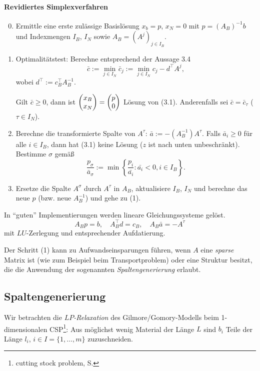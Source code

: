 \paragraph{Revidiertes Simplexverfahren}
\begin{enumerate}[(1)]
  \setcounter{enumi}{-1}
\item Ermittle eine erste zulässige Basislösung $x_b = p$, $x_N = 0$ mit $p =
  (A_B)^{-1} b$ und Indexmengen $I_B$, $I_N$ sowie $A_B = (A^j)_{j \in I_B}$.
\item Optimalitätstest: Berechne entsprechend der Aussage 3.4
  \[ \bar{c} := \min_{j \in I_N} \bar{c}_j := \min_{j \in I_N} c_j - d^\top A^j, \]
  wobei $d^\top := c_B^\top A_B^{-1}$.

  Gilt $\bar{c} \ge 0$, dann ist $\begin{pmatrix}x_B \\ x_N\end{pmatrix} = \begin{pmatrix}p \\ 0\end{pmatrix}$ Lösung von
  (3.1). Anderenfalls sei $\bar{c} = \bar{c}_\tau$ ($\tau \in I_N$).
\item Berechne die transformierte Spalte von $A^\tau$: $\bar{a} := -(A_B^{-1})
  A^\tau$. Falls  $\bar{a}_i \ge 0$ für alle $i \in I_B$, dann hat (3.1) keine
  Lösung ($z$ ist nach unten unbeschränkt). Bestimme $\sigma$ gemäß
  \[ \frac{ p_\sigma }{ \bar{a}_\sigma } := \min \left\{ \frac{p_i}{\bar{a_i}} :
      \bar{a_i} < 0, i \in I_B \right\}. \]
\item Ersetze die Spalte $A^\sigma$ durch $A^\tau$ in $A_B$, aktualisiere $I_B$,
  $I_N$ und berechne das neue $p$ (bzw. neue $A_B^{-1}$) und gehe zu (1).
\end{enumerate}

\begin{rmrk}
  In ``guten'' Implementierungen werden lineare Gleichungssysteme gelöst.
  \[ A_B p = b, \quad A_B^\top d = c_B, \quad A_B  \bar{a} = -A^\tau \]
  mit $LU$-Zerlegung und entsprechender Aufdatierung.
\end{rmrk}

\begin{rmrk}
  Der Schritt (1) kann zu Aufwandseinsparungen führen, wenn $A$ eine
  \emph{sparse} Matrix ist (wie zum Beispiel beim Transportproblem) oder eine
  Struktur besitzt, die die Anwendung der sogenannten \emph{Spaltengenerierung}
  erlaubt.
\end{rmrk}

\subsection{Spaltengenerierung}
Wir betrachten die \emph{$LP$-Relaxation} des Gilmore/Gomory-Modells beim
1-dimensionalen CSP\footnote{cutting stock problem, S. \pageref{sect:csp}}: Aus
möglichst wenig Material der Länge $L$ sind $b_i$ Teile der Länge $l_i$, $i \in
I = \{1, \ldots, m\}$ zuzuschneiden.

